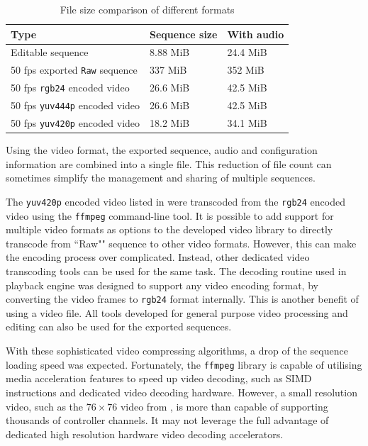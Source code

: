 \begin{table}[t]
  \centering
  \begin{tabular}{l|l|l}
    \hline
    \textbf{Type} & \textbf{Sequence size} & \textbf{With audio} \\
    \hline
    Editable sequence                     & 8.88 MiB  & 24.4 MiB  \\ \hline
    50 fps exported \texttt{Raw} sequence & 337 MiB   & 352 MiB   \\ \hline
    50 fps \texttt{rgb24} encoded video   & 26.6 MiB  & 42.5 MiB  \\ \hline
    50 fps \texttt{yuv444p} encoded video & 26.6 MiB  & 42.5 MiB  \\ \hline
    50 fps \texttt{yuv420p} encoded video & 18.2 MiB  & 34.1 MiB  \\ \hline
  \end{tabular}
  \caption{\footnotesize File size comparison of different formats}
  \label{tbl:size}
\end{table}

Using the video format, the exported sequence, audio and configuration information are combined into a single file. This reduction of file count can sometimes simplify the management and sharing of multiple sequences.

The \texttt{yuv420p} encoded video listed in  were transcoded from the \texttt{rgb24} encoded video using the \texttt{ffmpeg} command-line tool. It is possible to add support for multiple video formats as options to the developed video library to directly transcode from ``Raw"" sequence to other video formats. However, this can make the encoding process over complicated. Instead, other dedicated video transcoding tools can be used for the same task. The decoding routine used in playback engine was designed to support any video encoding format, by converting the video frames to \texttt{rgb24} format internally. This is another benefit of using a video file. All tools developed for general purpose video processing and editing can also be used for the exported sequences.

With these sophisticated video compressing algorithms, a drop of the sequence loading speed was expected. Fortunately, the \texttt{ffmpeg} library is capable of utilising media acceleration features to speed up video decoding, such as SIMD instructions and dedicated video decoding hardware. However, a small resolution video, such as the $76 \times 76$ video from , is more than capable of supporting thousands of controller channels. It may not leverage the full advantage of dedicated high resolution hardware video decoding accelerators.

